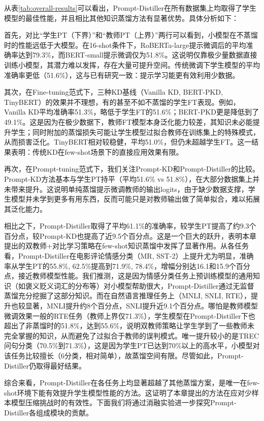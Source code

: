 \documentclass[../main.tex]{subfiles}
\begin{document}
从表\ref{tab:overall-results}可以看出，Prompt-Distiller在所有数据集上均取得了学生模型的最佳性能，并且相比其他知识蒸馏方法有显著优势。具体分析如下：

首先，对比“学生PT（下界）”和“教师PT（上界）”两行可以看到，小模型在不蒸馏时的性能远低于大模型。在16-shot条件下，RoBERTa-large提示微调后的平均准确率达到79.3\%，而BERT-small提示微调仅为51.8\%。这说明仅靠极少量数据直接训练小模型，其潜力难以发挥，存在大量可提升空间。传统微调下学生模型的平均准确率更低（51.6\%），这与已有研究一致：提示学习能更有效利用少数据。

其次，在Fine-tuning范式下，三种KD基线（Vanilla KD, BERT-PKD, TinyBERT）的效果并不理想，有的甚至不如不蒸馏的学生FT表现。例如，Vanilla KD平均准确率51.3\%，略低于学生FT的51.6\%；BERT-PKD更是降低到了49.1\%。这是因为在极少数据下，教师FT模型本身泛化能力较差，其知识未必能提升学生；同时附加的蒸馏损失可能让学生模型过拟合教师在训练集上的特殊模式，从而损害泛化。TinyBERT相对较稳健，平均51.0\%，但仍未超越学生FT。这一结果表明：传统KD在few-shot场景下的直接应用效果有限。

再次，在Prompt-tuning范式下，我们关注Prompt-KD和Prompt-Distiller的比较。Prompt-KD方法基本与学生PT持平（平均51.6\% vs 51.8\%），在大部分数据集上并未带来提升。这说明单纯蒸馏提示微调教师的输出logits，由于缺少数据支撑，学生模型并未学到更多有用东西，反而可能只是对教师输出做了简单拟合，难以拓展其泛化能力。

相比之下，Prompt-Distiller取得了平均61.1\%的准确率，较学生PT提高了约9.3个百分点，较Prompt-KD也提高了近9.5个百分点。这是一个巨大的跃升，表明本章提出的双教师+对比学习策略在few-shot知识蒸馏中发挥了显著作用。从各任务看，Prompt-Distiller在电影评论情感分类（MR, SST-2）上提升尤为明显，准确率从学生PT的55.8\%, 62.5\%提高到71.9\%, 78.4\%，增幅分别达16.1和15.9个百分点，接近教师模型性能。我们推测，这是因为情感分类任务上预训练模型的通用知识（如褒义贬义词汇的分布等）对小模型帮助很大，Prompt-Distiller通过无监督蒸馏充分挖掘了这部分知识。而在自然语言推理任务上（MNLI, SNLI, RTE），提升也较显著，MNLI提升约8个百分点，SNLI提升近9.1个百分点。哪怕是教师模型微调效果一般的RTE任务（教师上界仅71.3\%），学生模型在Prompt-Distiller下也超出了非蒸馏时的51.8\%，达到55.6\%，说明双教师策略让学生学到了一些教师未完全掌握的知识，从而避免了过拟合于教师的误判模式。唯一提升较小的是TREC问句分类（70.5\%到71.3\%），这是因为学生PT已达到70\%以上的高水平，小模型对该任务比较擅长（6分类，相对简单），故蒸馏空间有限。尽管如此，Prompt-Distiller仍取得最好结果。

综合来看，Prompt-Distiller在各任务上均显著超越了其他蒸馏方案，是唯一在few-shot环境下能有效提升学生模型性能的方法。这证明了本章提出的方法在应对少样本模型压缩挑战时的有效性。下面我们将通过消融实验进一步探究Prompt-Distiller各组成模块的贡献。
\end{document}
